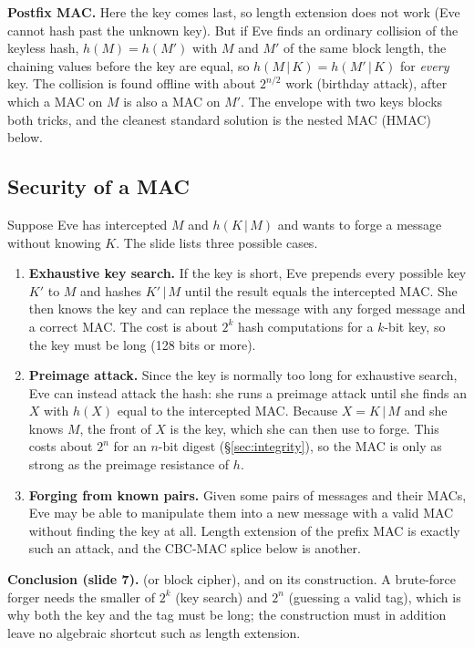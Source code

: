 \textbf{Postfix MAC.} Here the key comes last, so length extension does not work (Eve cannot hash past the unknown key). But if Eve finds an ordinary collision of the keyless hash, $h(M) = h(M')$ with $M$ and $M'$ of the same block length, the chaining values before the key are equal, so $h(M \,|\, K) = h(M' \,|\, K)$ for \emph{every} key. The collision is found offline with about $2^{n/2}$ work (birthday attack), after which a MAC on $M$ is also a MAC on $M'$. The envelope with two keys blocks both tricks, and the cleanest standard solution is the nested MAC (HMAC) below.

\subsection{Security of a MAC \new}

Suppose Eve has intercepted $M$ and $h(K \,|\, M)$ and wants to forge a message without knowing $K$. The slide lists three possible cases.
\begin{enumerate}[leftmargin=1.6em]
  \item \textbf{Exhaustive key search.} If the key is short, Eve prepends every possible key $K'$ to $M$ and hashes $K' \,|\, M$ until the result equals the intercepted MAC. She then knows the key and can replace the message with any forged message and a correct MAC. The cost is about $2^k$ hash computations for a $k$-bit key, so the key must be long (128 bits or more).
  \item \textbf{Preimage attack.} Since the key is normally too long for exhaustive search, Eve can instead attack the hash: she runs a preimage attack until she finds an $X$ with $h(X)$ equal to the intercepted MAC. Because $X = K \,|\, M$ and she knows $M$, the front of $X$ is the key, which she can then use to forge. This costs about $2^n$ for an $n$-bit digest (\S\ref{sec:integrity}), so the MAC is only as strong as the preimage resistance of $h$.
  \item \textbf{Forging from known pairs.} Given some pairs of messages and their MACs, Eve may be able to manipulate them into a new message with a valid MAC without finding the key at all. Length extension of the prefix MAC is exactly such an attack, and the CBC-MAC splice below is another.
\end{enumerate}
\textbf{Conclusion (slide 7).}  (or block cipher), and on its construction. A brute-force forger needs the smaller of $2^k$ (key search) and $2^n$ (guessing a valid tag), which is why both the key and the tag must be long; the construction must in addition leave no algebraic shortcut such as length extension.

